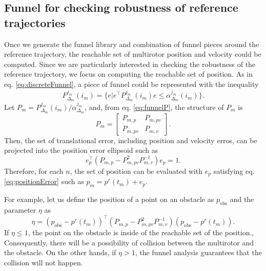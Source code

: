\documentclass[letterpaper, 10 pt, conference]{ieeeconf}  %
\begin{document}
\subsection{Funnel for checking robustness of reference trajectories}
Once we generate the funnel library and combination of funnel pieces around the reference trajectory, the reachable set of multirotor position and velocity could be computed. Since we are particularly interested in checking the robustness of the reference trajectory, we focus on computing the reachable set of position.
As in eq. \eqref{eq:discreteFunnel}, a piece of funnel could be represented with the inequality 
\begin{equation}
F_{\Delta_m}^{j_m}(i_m) = \{e|e^\top P_{\Delta_m}^{j_m}(i_m)e \leq \alpha_{\Delta_m}^{j_m}(i_m)\}. \nonumber
\end{equation} 
Let $P_m = P_{\Delta_m}^{j_m}(i_m) / \alpha_{\Delta_m}^{j_m}$, and, from eq. \eqref{eq:funnelP}, the structure of $P_m$ is
\begin{equation}
P_m = \left[
\begin{array}{cc}
P_{m,p} & P_{m,pv} \\
P_{m,pv} & P_{m,v} 
\end{array}
\right]. \nonumber
\end{equation}
Then, the set of translational error, including position and velocity erros, can be projected into the position error ellipsoid such as
\begin{equation}
e_p^\top (P_{m,p} - P_{m,pv}^2 P_{m,v}^{-1}) e_p = 1. \label{eq:positionError}
\end{equation}
Therefore, for each $n$, the set of position can be evaluated with $e_p$ satisfying eq. \eqref{eq:positionError} such as $p_m = p^r(t_m) + e_p$.  

For example, let us define the position of a point on an obstacle as $p_\text{obs}$ and the parameter $\eta$ as 
\begin{equation}
\eta = (p_\text{obs}-p^r(t_m))^\top (P_{m,p} - P_{m,pv}^2 P_{m,v}^{-1})(p_\text{obs}-p^r(t_m)). \nonumber
\end{equation}
If $\eta \leq 1$, the point on the obstacle is inside of the reachable set of the position., Consequently, there will be a possibility of collision between the multirotor and the obstacle. On the other hands, if $\eta > 1$, the funnel analysis guarantees that the collision will not happen. 
\end{document}
